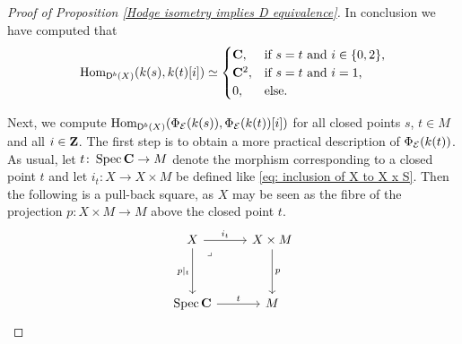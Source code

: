 \begin{proof}[Proof of Proposition \ref{Hodge isometry implies D equivalence}]
    

    In conclusion we have computed that
    \begin{equation}
            \operatorname{Hom}_{\mathsf{D}^b(X)}(k(s), k(t)[i]) \simeq \begin{cases}
                \mathbf C, &\text{if $s = t$ and $i \in \{0, 2\}$,} \\
                \mathbf C^2, &\text{if $s = t$ and $i = 1$,} \\
                0, &\text{else.}
            \end{cases}
    \end{equation}
    
    Next, we compute $\operatorname{Hom}_{\mathsf{D}^b(X)}(\Phi_{\mathcal E}(k(s)), \Phi_{\mathcal E}(k(t))[i])$ for all closed points $s$, $t \in M$ and all $i \in \mathbf Z$. The first step is to obtain a more practical description of $\Phi_{\mathcal E}(k(t))$. As usual, let $t \colon \operatorname{Spec}\mathbf C \to M$ denote the morphism corresponding to a closed point $t$ and let $i_t \colon X \to X \times M$ be defined like \eqref{eq: inclusion of X to X x S}. Then the following is a pull-back square, as $X$ may be seen as the fibre of the projection $p \colon X \times M \to M$ above the closed point $t$.
    \[\begin{tikzcd}[column sep = small, row sep = 1.8em]
        X && X \times M \\
        \\
        \spec{\C} && M
        \arrow["{i_t}", from=1-1, to=1-3]
        \arrow["{p|_t}"', from=1-1, to=3-1]
        \arrow["\lrcorner"{anchor=center, pos=0.125}, draw=none, from=1-1, to=3-3]
        \arrow["{p}", from=1-3, to=3-3]
        \arrow["{t}", from=3-1, to=3-3]
    \end{tikzcd}\]




\end{proof}
